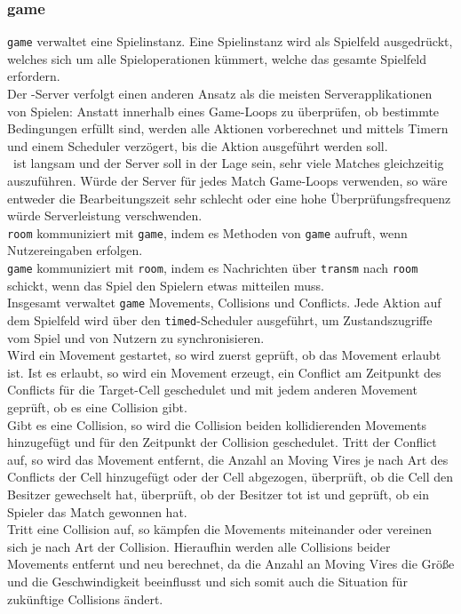 \subsubsection{game}
\verb+game+ verwaltet eine Spielinstanz. Eine Spielinstanz wird als Spielfeld ausgedrückt, welches sich um alle Spieloperationen kümmert, welche das gesamte Spielfeld erfordern. \\
Der \vires-Server verfolgt einen anderen Ansatz als die meisten Serverapplikationen von Spielen: 
Anstatt innerhalb eines Game-Loops zu überprüfen, ob bestimmte Bedingungen erfüllt sind,
werden alle Aktionen vorberechnet und mittels Timern und einem Scheduler verzögert, bis die Aktion ausgeführt werden soll. \\
\vires\ ist langsam und der Server soll in der Lage sein, sehr viele Matches gleichzeitig auszuführen. 
Würde der Server für jedes Match Game-Loops verwenden, so wäre entweder die Bearbeitungszeit sehr schlecht oder eine hohe
Überprüfungsfrequenz würde Serverleistung verschwenden. \\
\verb+room+ kommuniziert mit \verb+game+, indem es Methoden von \verb+game+ aufruft, wenn Nutzereingaben erfolgen. \\
\verb+game+ kommuniziert mit \verb+room+, indem es Nachrichten über \verb+transm+ nach \verb+room+ schickt, wenn das Spiel den Spielern etwas mitteilen muss. \\
Insgesamt verwaltet \verb+game+ Movements, Collisions und Conflicts. Jede Aktion auf dem Spielfeld wird über den \verb+timed+-Scheduler
ausgeführt, um Zustandszugriffe vom Spiel und von Nutzern zu synchronisieren. \\
Wird ein Movement gestartet, so wird zuerst geprüft, ob das Movement erlaubt ist. Ist es erlaubt, so wird ein Movement erzeugt, 
ein Conflict am Zeitpunkt des Conflicts für die Target-Cell geschedulet und mit jedem anderen Movement geprüft, ob es eine Collision gibt. \\
Gibt es eine Collision, so wird die Collision beiden kollidierenden Movements hinzugefügt und für den Zeitpunkt der Collision geschedulet.
Tritt der Conflict auf, so wird das Movement entfernt, die Anzahl an Moving Vires je nach Art des Conflicts der Cell hinzugefügt oder der Cell abgezogen,
überprüft, ob die Cell den Besitzer gewechselt hat, überprüft, ob der Besitzer tot ist und geprüft, ob ein Spieler das Match gewonnen hat. \\
Tritt eine Collision auf, so kämpfen die Movements miteinander oder vereinen sich je nach Art der Collision.
Hieraufhin werden alle Collisions beider Movements entfernt und neu berechnet, da die Anzahl an Moving Vires die Größe und die Geschwindigkeit beeinflusst und sich somit auch die Situation für zukünftige Collisions ändert.
